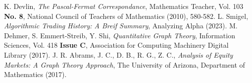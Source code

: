 \documentclass{article}
\begin{document}

\begin{thebibliography}{99}
    K. Devlin, \emph{The Pascal-Fermat Correspondance}, Mathematics Teacher, Vol. 103 \textbf{No. 8}, National Council of Teachers of Mathematics (2010), 580-582.
    L. Smigel, \emph{Algorithmic Trading History: A Breif Summary}, Analyzing Alpha (2023).
    M. Dehmer, S. Emmert-Streib, Y. Shi, \emph{Quantitative Graph Theory}, Information Sciences, Vol. 418 \textbf{Issue C}, Association for Computing Machinery Digital Library (2017).
    J. R. Abrams, J. C., D. B., R. G., Z. C., \emph{Analysis of Equity Markets: A Graph Theory Approach}, The University of Arizona, Department of Mathematics (2017).
\end{thebibliography}
\end{document}
